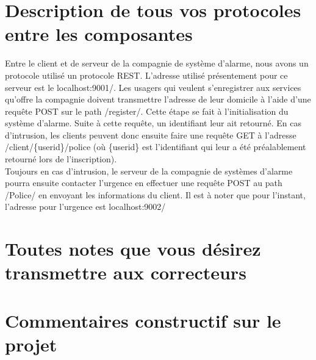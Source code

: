 
\section*{Description de tous vos protocoles entre les composantes}
Entre le client et de serveur de la compagnie de système d'alarme, nous avons un protocole utilisé un protocole REST. L'adresse utilisé présentement pour ce serveur est le localhost:9001/. Les usagers qui veulent s'enregistrer aux services qu'offre la compagnie doivent transmettre l'adresse de leur domicile à l'aide d'une requête POST sur le path /register/. Cette étape se fait à l'initialisation du système d'alarme. Suite à cette requête, un identifiant leur ait retourné. En cas d'intrusion, les clients peuvent donc ensuite faire une requête GET à l'adresse /client/\{userid\}/police (où \{userid\} est l'identifiant qui leur a été préalablement retourné lors de l'inscription). \\

Toujours en cas d'intrusion, le serveur de la compagnie de systèmes d'alarme pourra ensuite contacter l'urgence en effectuer une requête POST au path /Police/ en envoyant les informations du client. Il est à noter que pour l'instant, l'adresse pour l'urgence est localhost:9002/

\section*{Toutes notes que vous désirez transmettre aux correcteurs}

\section*{Commentaires constructif sur le projet}
